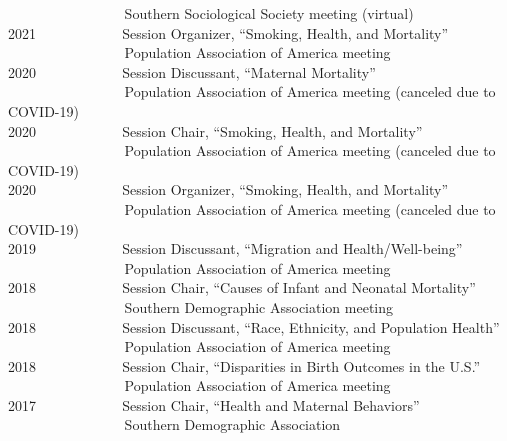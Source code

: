\documentclass[11pt,]{article}
\begin{document}
\hspace*{0.333em} ~ ~ ~ ~ ~ ~ ~ ~ ~ ~ Southern Sociological Society
meeting (virtual)\\
2021 ~ ~ ~ ~ ~ ~ ~ Session Organizer, ``Smoking, Health, and
Mortality''\\
\hspace*{0.333em} ~ ~ ~ ~ ~ ~ ~ ~ ~ ~ Population Association of America
meeting\\
2020 ~ ~ ~ ~ ~ ~ ~ Session Discussant, ``Maternal Mortality''\\
\hspace*{0.333em} ~ ~ ~ ~ ~ ~ ~ ~ ~ ~ Population Association of America
meeting (canceled due to COVID-19)\\
2020 ~ ~ ~ ~ ~ ~ ~ Session Chair, ``Smoking, Health, and Mortality''\\
\hspace*{0.333em} ~ ~ ~ ~ ~ ~ ~ ~ ~ ~ Population Association of America
meeting (canceled due to COVID-19)\\
2020 ~ ~ ~ ~ ~ ~ ~ Session Organizer, ``Smoking, Health, and
Mortality''\\
\hspace*{0.333em} ~ ~ ~ ~ ~ ~ ~ ~ ~ ~ Population Association of America
meeting (canceled due to COVID-19)\\
2019 ~ ~ ~ ~ ~ ~ ~ Session Discussant, ``Migration and
Health/Well-being''\\
\hspace*{0.333em} ~ ~ ~ ~ ~ ~ ~ ~ ~ ~ Population Association of America
meeting\\
2018 ~ ~ ~ ~ ~ ~ ~ Session Chair, ``Causes of Infant and Neonatal
Mortality''\\
\hspace*{0.333em} ~ ~ ~ ~ ~ ~ ~ ~ ~ ~ Southern Demographic Association
meeting\\
2018 ~ ~ ~ ~ ~ ~ ~ Session Discussant, ``Race, Ethnicity, and Population
Health''\\
\hspace*{0.333em} ~ ~ ~ ~ ~ ~ ~ ~ ~ ~ Population Association of America
meeting\\
2018 ~ ~ ~ ~ ~ ~ ~ Session Chair, ``Disparities in Birth Outcomes in the
U.S.''\\
\hspace*{0.333em} ~ ~ ~ ~ ~ ~ ~ ~ ~ ~ Population Association of America
meeting\\
2017 ~ ~ ~ ~ ~ ~ ~ Session Chair, ``Health and Maternal Behaviors''\\
\hspace*{0.333em} ~ ~ ~ ~ ~ ~ ~ ~ ~ ~ Southern Demographic Association
\end{document}
